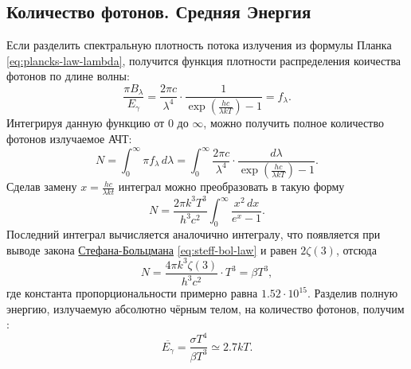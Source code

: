 \subsection{Количество фотонов. Средняя Энергия}
Если разделить спектральную плотность потока излучения из формулы Планка \eqref{eq:plancks-law-lambda}, получится функция плотности распределения коичества фотонов по длине волны:
\begin{equation*}
	\frac{\pi B_{\lambda}}{E_{\gamma}} = \frac{2 \pi c}{\lambda^4} \cdot \frac{1}{\exp\left(\frac{hc}{\lambda k T}\right)-1} = f_{\lambda}.
\end{equation*}
Интегрируя данную функцию от 0 до $\infty$, можно получить полное количество фотонов излучаемое АЧТ:
\begin{equation*}
	N = \int_{0}^{\infty}{\pi f_{\lambda}\,d\lambda} = \int_{0}^{\infty}{\frac{2\pi c}{\lambda^4} \cdot \frac{d\lambda}{\exp\left(\frac{hc}{\lambda k T}\right)-1}}.
\end{equation*}
Сделав замену $x = \frac{hc}{\lambda kt}$ интеграл можно преобразовать в такую форму
\begin{equation*}
	N = \frac{2\pi k^3 T^3}{h^3 c^2}\int_{0}^{\infty}{\frac{x^2 \,dx}{e^x-1}}.
\end{equation*}
Последний интеграл вычисляется аналочично интегралу, что появляется при выводе закона \hyperref[subsec:stef-boltz-law]{Стефана-Больцмана} \eqref{eq:steff-bol-law} и равен $2\zeta(3)$, отсюда
\begin{equation}
	N = \frac{4\pi k^3 \zeta(3)}{h^3 c^2} \cdot T^3 = \beta T^3, 
\end{equation}
где константа пропорциональности примерно равна $1.52 \cdot 10^{15}$. 
Разделив полную энергию, излучаемую абсолютно чёрным телом, на количество фотонов, получим :
\begin{equation}
	\overline{E_{\gamma}} = \frac{\sigma T^4}{\beta T^3} \simeq 2.7 k T.
\end{equation}